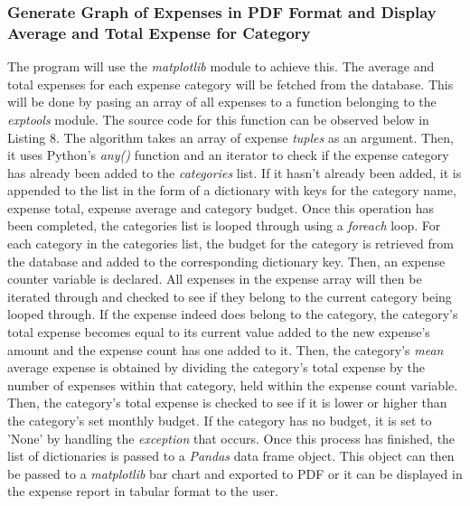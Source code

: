 \documentclass[11pt]{article}
\begin{document}
  \subsubsection{Generate Graph of Expenses in PDF Format and Display Average and Total Expense for Category}
  The program will use the \textit{matplotlib} module to achieve this. The average and total expenses for each expense category will be fetched from the database. This will be done by pasing an array of all expenses to a function belonging to the \textit{exptools} module. The source code for this function can be observed below in Listing 8. The algorithm takes an array of expense \textit{tuples} as an argument. Then, it uses Python's \textit{any()} function and an iterator to check if the expense category has already been added to the \textit{categories} list. If it hasn't already been added, it is appended to the list in the form of a dictionary with keys for the category name, expense total, expense average and category budget. Once this operation has been completed, the categories list is looped through using a \textit{foreach} loop. For each category in the categories list, the budget for the category is retrieved from the database and added to the corresponding dictionary key. Then, an expense counter variable is declared. All expenses in the expense array will then be iterated through and checked to see if they belong to the current category being looped through. If the expense indeed does belong to the category, the category's total expense becomes equal to its current value added to the new expense's amount and the expense count has one added to it. Then, the category's \textit{mean} average expense is obtained by dividing the category's total expense by the number of expenses within that category, held within the expense count variable.
  Then, the category's total expense is checked to see if it is lower or higher than the category's set monthly budget. If the category has no budget, it is set to 'None' by handling the \textit{exception} that occurs.
  Once this process has finished, the list of dictionaries is passed to a \textit{Pandas} data frame object. This object can then be passed to a \textit{matplotlib} bar chart and exported to PDF or it can be displayed in the expense report in tabular format to the user.
\end{document}
